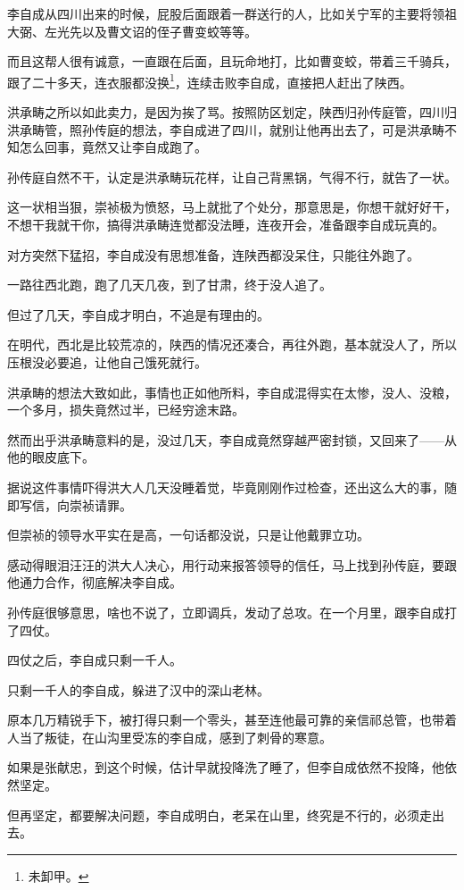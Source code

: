 \begin{multicols}{\theparacolNo}
李自成从四川出来的时候，屁股后面跟着一群送行的人，比如关宁军的主要将领祖大弼、左光先以及曹文诏的侄子曹变蛟等等。

而且这帮人很有诚意，一直跟在后面，且玩命地打，比如曹变蛟，带着三千骑兵，跟了二十多天，连衣服都没换\footnote{未卸甲。}，连续击败李自成，直接把人赶出了陕西。

洪承畴之所以如此卖力，是因为挨了骂。按照防区划定，陕西归孙传庭管，四川归洪承畴管，照孙传庭的想法，李自成进了四川，就别让他再出去了，可是洪承畴不知怎么回事，竟然又让李自成跑了。

孙传庭自然不干，认定是洪承畴玩花样，让自己背黑锅，气得不行，就告了一状。

这一状相当狠，崇祯极为愤怒，马上就批了个处分，那意思是，你想干就好好干，不想干我就干你，搞得洪承畴连觉都没法睡，连夜开会，准备跟李自成玩真的。

对方突然下猛招，李自成没有思想准备，连陕西都没呆住，只能往外跑了。

一路往西北跑，跑了几天几夜，到了甘肃，终于没人追了。

但过了几天，李自成才明白，不追是有理由的。

在明代，西北是比较荒凉的，陕西的情况还凑合，再往外跑，基本就没人了，所以压根没必要追，让他自己饿死就行。

洪承畴的想法大致如此，事情也正如他所料，李自成混得实在太惨，没人、没粮，一个多月，损失竟然过半，已经穷途末路。

然而出乎洪承畴意料的是，没过几天，李自成竟然穿越严密封锁，又回来了——从他的眼皮底下。

据说这件事情吓得洪大人几天没睡着觉，毕竟刚刚作过检查，还出这么大的事，随即写信，向崇祯请罪。

但崇祯的领导水平实在是高，一句话都没说，只是让他戴罪立功。

感动得眼泪汪汪的洪大人决心，用行动来报答领导的信任，马上找到孙传庭，要跟他通力合作，彻底解决李自成。

孙传庭很够意思，啥也不说了，立即调兵，发动了总攻。在一个月里，跟李自成打了四仗。

四仗之后，李自成只剩一千人。

只剩一千人的李自成，躲进了汉中的深山老林。

原本几万精锐手下，被打得只剩一个零头，甚至连他最可靠的亲信祁总管，也带着人当了叛徒，在山沟里受冻的李自成，感到了刺骨的寒意。

如果是张献忠，到这个时候，估计早就投降洗了睡了，但李自成依然不投降，他依然坚定。

但再坚定，都要解决问题，李自成明白，老呆在山里，终究是不行的，必须走出去。


\end{multicols}
